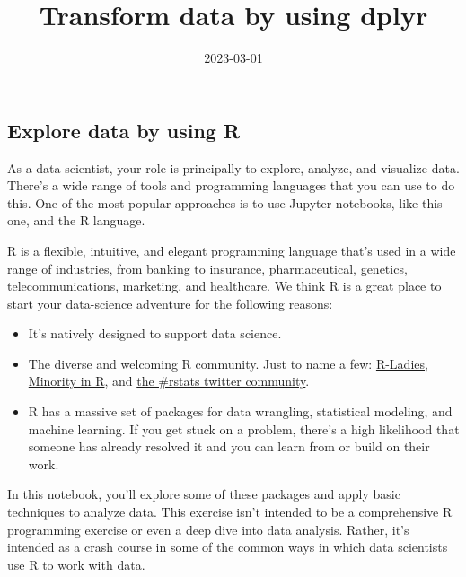 \documentclass[
]{article}
\title{Transform data by using dplyr}
\author{}
\date{\vspace{-2.5em}2023-03-01}
\begin{document}
\maketitle

\hypertarget{explore-data-by-using-r}{%
\subsection{Explore data by using R}\label{explore-data-by-using-r}}

As a data scientist, your role is principally to explore, analyze, and
visualize data. There's a wide range of tools and programming languages
that you can use to do this. One of the most popular approaches is to
use Jupyter notebooks, like this one, and the R language.

R is a flexible, intuitive, and elegant programming language that's used
in a wide range of industries, from banking to insurance,
pharmaceutical, genetics, telecommunications, marketing, and healthcare.
We think R is a great place to start your data-science adventure for the
following reasons:

\begin{itemize}
\item
  It's natively designed to support data science.
\item
  The diverse and welcoming R community. Just to name a few:
  \href{http://r-ladies.org/}{R-Ladies},
  \href{https://medium.com/@doritolay/introducing-mir-a-community-for-underrepresented-users-of-r-7560def7d861}{Minority
  in R}, and \href{https://twitter.com/search?q=\%23rstats}{the \#rstats
  twitter community}.
\item
  R has a massive set of packages for data wrangling, statistical
  modeling, and machine learning. If you get stuck on a problem, there's
  a high likelihood that someone has already resolved it and you can
  learn from or build on their work.
\end{itemize}

In this notebook, you'll explore some of these packages and apply basic
techniques to analyze data. This exercise isn't intended to be a
comprehensive R programming exercise or even a deep dive into data
analysis. Rather, it's intended as a crash course in some of the common
ways in which data scientists use R to work with data.
\end{document}
